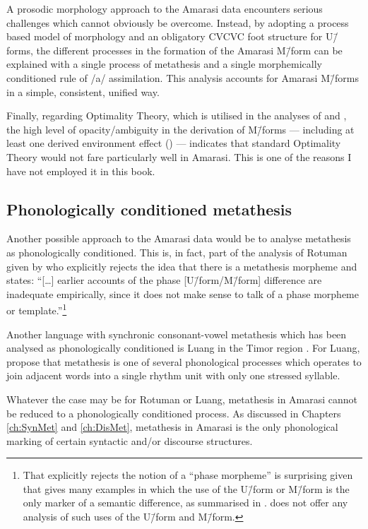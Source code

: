 A prosodic morphology approach to the Amarasi data encounters
serious challenges which cannot obviously be overcome.
Instead, by adopting a process based model of morphology
and an obligatory CVCVC foot structure for U\=/forms,
the different processes in the formation of the Amarasi M\=/form
can be explained with a single process of metathesis
and a single morphemically conditioned rule of /a/ assimilation.
This analysis accounts for Amarasi M\=/forms
in a simple, consistent, unified way.

Finally, regarding Optimality Theory, which is
utilised in the analyses of \cite{mcc00} and \cite{he04},
the high level of opacity/ambiguity in the derivation of M\=/forms
--- including at least one derived environment effect () ---
indicates that standard Optimality Theory would not fare particularly well in Amarasi.
This is one of the reasons I have not employed it in this book.

\subsection{Phonologically conditioned metathesis}\label{sec:AltAppPhoMet}
Another possible approach to the Amarasi data would
be to analyse metathesis as phonologically conditioned.
This is, in fact, part of the analysis of Rotuman
given by \citet[168]{mcc00} who explicitly rejects
the idea that there is a metathesis morpheme and states:
``[\ldots] earlier accounts of the phase [U\=/form/M\=/form] difference are inadequate empirically,
since it does not make sense to talk of a phase morpheme or template.''\footnote{
		That \cite{mcc00} explicitly rejects the notion of a ``phase morpheme'' is surprising
		given that \cite{ch40} gives many examples in which the use of the
		U\=/form or M\=/form is the only marker of a semantic difference,
		as summarised in .
		\cite{mcc00} does not offer any analysis of
		such uses of the U\=/form and M\=/form.}

Another language with synchronic consonant-vowel metathesis
which has been analysed as phonologically conditioned
is Luang in the Timor region \citep{tata15}.
For Luang, \citet[24]{tata15} propose that metathesis
is one of several phonological processes which operates to join
adjacent words into a single rhythm unit with only one stressed syllable.

Whatever the case may be for Rotuman or Luang,
metathesis in Amarasi cannot be reduced
to a phonologically conditioned process.
As discussed in Chapters \ref{ch:SynMet} and \ref{ch:DisMet},
metathesis in Amarasi is the only phonological marking
of certain syntactic and/or discourse structures.

